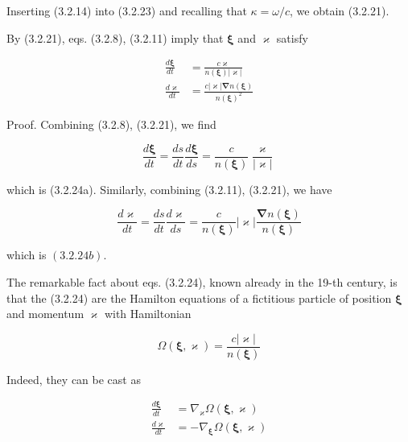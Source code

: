 \documentclass{article}
\begin{document}
Inserting (3.2.14) into (3.2.23) and recalling that $\kappa=\omega / c$, we obtain (3.2.21).

By (3.2.21), eqs. (3.2.8), (3.2.11) imply that $\boldsymbol{\xi}$ and $\boldsymbol{\varkappa}$ satisfy
 
\begin{align*}
\frac{d \boldsymbol{\xi}}{d t} & =\frac{c \boldsymbol{\varkappa}}{n(\boldsymbol{\xi})|\boldsymbol{\varkappa}|}  \tag{3.2.24a}\\
\frac{d \boldsymbol{\varkappa}}{d t} & =\frac{c|\boldsymbol{\varkappa}| \boldsymbol{\nabla} n(\boldsymbol{\xi})}{n(\boldsymbol{\xi})^{2}} \tag{3.2.24b}
\end{align*}
 

Proof. Combining (3.2.8), (3.2.21), we find
 
\begin{equation*}
\frac{d \boldsymbol{\xi}}{d t}=\frac{d s}{d t} \frac{d \boldsymbol{\xi}}{d s}=\frac{c}{n(\boldsymbol{\xi})} \frac{\varkappa}{|\varkappa|} \tag{3.2.25}
\end{equation*}
 
which is (3.2.24a). Similarly, combining (3.2.11), (3.2.21), we have
 
\begin{equation*}
\frac{d \varkappa}{d t}=\frac{d s}{d t} \frac{d \varkappa}{d s}=\frac{c}{n(\boldsymbol{\xi})}|\varkappa| \frac{\boldsymbol{\nabla} n(\boldsymbol{\xi})}{n(\boldsymbol{\xi})} \tag{3.2.26}
\end{equation*}
 
which is $(3.2 .24 b)$.

The remarkable fact about eqs. (3.2.24), known already in the 19-th century, is that the (3.2.24) are the Hamilton equations of a fictitious particle of position $\boldsymbol{\xi}$ and momentum $\boldsymbol{\varkappa}$ with Hamiltonian
 
\begin{equation*}
\Omega(\boldsymbol{\xi}, \boldsymbol{\varkappa})=\frac{c|\boldsymbol{\varkappa}|}{n(\boldsymbol{\xi})} \tag{3.2.27}
\end{equation*}
 

Indeed, they can be cast as
 
\begin{align*}
\frac{d \boldsymbol{\xi}}{d t} & =\nabla_{\varkappa} \Omega(\boldsymbol{\xi}, \boldsymbol{\varkappa})  \tag{3.2.28a}\\
\frac{d \varkappa}{d t} & =-\nabla_{\boldsymbol{\xi}} \Omega(\boldsymbol{\xi}, \boldsymbol{\varkappa}) \tag{3.2.28b}
\end{align*}
 
\end{document}
